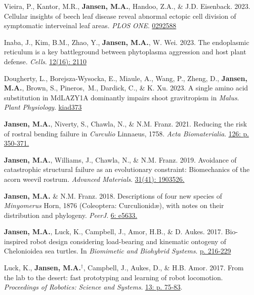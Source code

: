 \documentclass[12pt,a4paper]{article}
\begin{document}
\begin{description}
	\item Vieira, P., Kantor, M.R., \textbf{Jansen, M.A.}, Handoo, Z.A., \& J.D. Eisenback. 2023. Cellular insights of beech leaf disease reveal abnormal ectopic cell division of symptomatic interveinal leaf areas. \textit{PLOS ONE}. \href{https://doi.org/10.1371/journal.pone.0292588}{0292588}
	
	\item Inaba, J., Kim, B.M., Zhao, Y., \textbf{Jansen, M.A.}, W. Wei. 2023. The endoplasmic reticulum is a key battleground between phytoplasma aggression and host plant defense. \textit{Cells}. \href{https://doi.org/10.3390/cells12162110}{12(16): 2110}
	
	\item Dougherty, L., Borejsza-Wysocka, E., Miaule, A., Wang, P., Zheng, D., \textbf{Jansen, M.A.}, Brown, S., Pineros,~M., Dardick, C., \& K. Xu. 2023. A single amino acid substitution in MdLAZY1A dominantly impairs shoot gravitropism in \textit{Malus}. \textit{Plant Physiology}. \href{https://doi.org/10.1093/plphys/kiad373}{kiad373}
	
	\item \textbf{Jansen, M.A.}, Niverty, S., Chawla, N., \& N.M. Franz. 2021. Reducing the risk of rostral bending failure in \textit{Curculio} Linnaeus, 1758. \textit{Acta Biomaterialia}. \href{https://doi.org/10.1016/j.actbio.2021.03.029}{126: p. 350-371.}
	
	\item \textbf{Jansen, M.A.}, Williams, J., Chawla, N., \& N.M. Franz. 2019. Avoidance of catastrophic structural failure as an evolutionary constraint: Biomechanics of the acorn weevil rostrum. \textit{Advanced Materials}. \href{https://doi.org/10.1002/adma.201903526}{31(41): 1903526.}
	
	\item \textbf{Jansen, M.A.} \& N.M. Franz. 2018. Descriptions of four new species of \textit{Minyomerus} Horn, 1876 (Coleoptera: Curculionid\ae), with notes on their distribution and phylogeny. \textit{PeerJ}. \href{https://peerj.com/articles/5633/}{6: e5633.}
	
	\item \textbf{Jansen, M.A.}, Luck, K., Campbell, J., Amor, H.B., \& D. Aukes. 2017. Bio-inspired robot design considering load-bearing and kinematic ontogeny of Chelonioidea sea turtles. In \textit{Biomimetic and Biohybrid Systems}. \href{http://www.springer.com/us/book/9783319635361}{p. 216-229}
	
	\item Luck, K., \textbf{Jansen, M.A.}$^\dagger$, Campbell, J., Aukes, D., \& H.B. Amor. 2017. From the lab to the desert: fast prototyping and learning of robot locomotion. \textit{Proceedings of Robotics: Science and Systems}. \href{http://www.roboticsproceedings.org/rss13/p75.html}{13: p. 75-83}.
	

\end{description}
\end{document}

